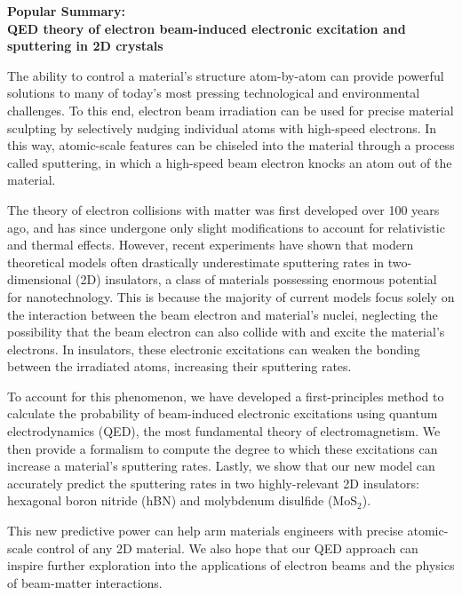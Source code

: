 \documentclass{article}
\begin{document}
\begin{center}
  \Large{\textbf{
    Popular Summary: \\
    QED theory of electron beam-induced electronic excitation and sputtering
    in 2D crystals
}}
\end{center}

The ability to control a material's structure atom-by-atom can provide
powerful solutions to many of today’s most pressing technological and
environmental challenges.
To this end, electron beam irradiation can be used for precise material
sculpting by selectively nudging individual atoms with high-speed electrons.
In this way, atomic-scale features can be chiseled into the material through a
process called sputtering, in which a high-speed beam electron knocks an atom
out of the material.

The theory of electron collisions with matter was first developed over 100
years ago, and has since undergone only slight modifications to account for
relativistic and thermal effects.
However, recent experiments have shown that modern theoretical models often
drastically underestimate sputtering rates in two-dimensional (2D) insulators,
a class of materials possessing enormous potential for nanotechnology.
This is because the majority of current models focus solely on the interaction
between the beam electron and material's nuclei, neglecting the possibility that
the beam electron can also collide with and excite the material's electrons.
In insulators, these electronic excitations can weaken the bonding between the
irradiated atoms, increasing their sputtering rates.

To account for this phenomenon, we have developed a first-principles method to
calculate the probability of beam-induced electronic excitations using quantum
electrodynamics (QED), the most fundamental theory of electromagnetism.
We then provide a formalism to compute the degree to which these excitations
can increase a material's sputtering rates.
Lastly, we show that our new model can accurately predict the sputtering rates
in two highly-relevant 2D insulators: hexagonal boron nitride (hBN) and
molybdenum disulfide (MoS$_2$).

This new predictive power can help arm materials engineers with precise
atomic-scale control of any 2D material.
We also hope that our QED approach can inspire further exploration into the
applications of electron beams and the physics of beam-matter interactions.
\end{document}
